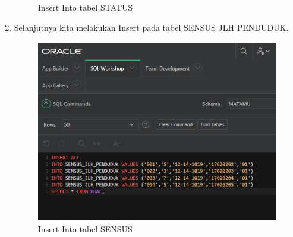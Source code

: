 \begin{enumerate}
\begin{figure}[!htbp]
\caption{Insert Into tabel STATUS}
\label{penanda}
\end{figure}
\item Selanjutnya kita melakukan Insert pada tabel SENSUS JLH PENDUDUK.
\begin{figure}[!htbp]
\centering
\includegraphics[width=13cm,height=8cm]{figures/G1.PNG}
\caption{Insert Into tabel SENSUS}
\label{penanda}
\end{figure}

\end{enumerate}
